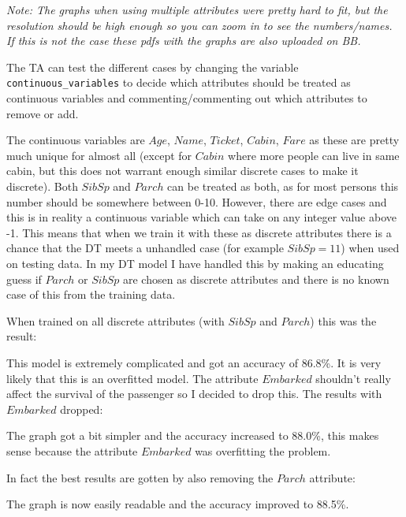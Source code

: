\documentclass[11pt, english]{../Template/NTNUoving}
\begin{document}
\textit{Note: The graphs when using multiple attributes were pretty hard to fit, but the resolution should be high enough so you can zoom in to see the numbers/names.
If this is not the case these pdfs with the graphs are also uploaded on BB.}


\begin{oppgave}

    The TA can test the different cases by changing the variable \texttt{continuous\_variables} to decide which attributes should be treated as continuous variables and commenting/commenting out
    which attributes to remove or add.

    \begin{punkt}
        The continuous variables are $Age$, $Name$, $Ticket$, $Cabin$, $Fare$ as these are pretty much
        unique for almost all (except for $Cabin$ where more people can live in same cabin, but this does not warrant enough similar discrete cases to make it discrete). Both $SibSp$ and $Parch$ can be treated as
        both, as for most persons this number should be somewhere between 0-10. However, there are edge cases and this is in reality a continuous variable which can take on any integer value above -1. This means that when we train it
        with these as discrete attributes there is a chance that the DT meets a unhandled case (for example $SibSp = 11$) when used on testing data.
        In my DT model I have handled this by making an educating guess if $Parch$ or $SibSp$ are chosen as discrete attributes and there is no known case of this from the
        training data.

        When trained on all discrete attributes (with $SibSp$ and $Parch$) this was the result:
        

        This model is extremely complicated and got an accuracy of 86.8\%. It is very likely that this is an overfitted model.
        The attribute $Embarked$ shouldn't really affect the survival of the passenger so I decided to drop this. The results with $Embarked$ dropped:
        

        The graph got a bit simpler and the accuracy increased to 88.0\%, this makes sense because
        the attribute $Embarked$ was overfitting the problem.

        In fact the best results are gotten by also removing the $Parch$ attribute:
        

        The graph is now easily readable and the accuracy improved to 88.5\%.


\end{punkt}
\end{oppgave}
\end{document}
